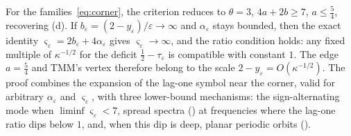 \documentclass[11pt]{article}
\theoremstyle{definition}
\theoremstyle{remark}
\begin{document}
For the families~\eqref{eq:corner}, the criterion reduces to
\(\theta=3\), \(4a+2b\ge7\), \(a\le\frac54\), recovering (d).  If \(b_\varepsilon=(2-y_\varepsilon)/\varepsilon\to\infty\)
and \(\alpha_\varepsilon\) stays bounded, then the exact identity
\(\varsigma_\varepsilon=2b_\varepsilon+4\alpha_\varepsilon\) gives
\(\varsigma_\varepsilon\to\infty\), and the ratio condition holds: any fixed multiple of
\(\kappa^{-1/2}\) for the deficit \(\frac12-\tau_\varepsilon\) is compatible with constant \(1\).
The edge \(a=\frac54\) and TMM's vertex therefore belong to the scale
\(2-y_\varepsilon=O(\kappa^{-1/2})\).  The proof combines the expansion of the lag-one symbol near the
corner, valid for arbitrary \(\alpha_\varepsilon\) and \(\varsigma_\varepsilon\), with three lower-bound mechanisms: the
sign-alternating mode when \(\liminf\varsigma_\varepsilon<7\), spread spectra () at frequencies
where the lag-one ratio dips below \(1\), and, when this dip is deep, planar periodic orbits
().
\end{document}
